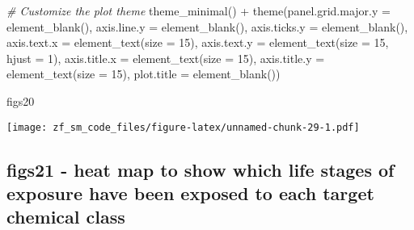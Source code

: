 \documentclass[
]{article}
\newenvironment{Shaded}{\begin{snugshade}}{\end{snugshade}}
\newcommand{\AttributeTok}[1]{\textcolor[rgb]{0.77,0.63,0.00}{#1}}
\newcommand{\CommentTok}[1]{\textcolor[rgb]{0.56,0.35,0.01}{\textit{#1}}}
\newcommand{\DecValTok}[1]{\textcolor[rgb]{0.00,0.00,0.81}{#1}}
\newcommand{\FunctionTok}[1]{\textcolor[rgb]{0.00,0.00,0.00}{#1}}
\newcommand{\NormalTok}[1]{#1}
\newcommand{\SpecialCharTok}[1]{\textcolor[rgb]{0.00,0.00,0.00}{#1}}
\begin{document}
\begin{Shaded}
\begin{Highlighting}[]
  \CommentTok{\# Customize the plot theme}
  \FunctionTok{theme\_minimal}\NormalTok{() }\SpecialCharTok{+}
  \FunctionTok{theme}\NormalTok{(}\AttributeTok{panel.grid.major.y =} \FunctionTok{element\_blank}\NormalTok{(),}
    \AttributeTok{axis.line.y =} \FunctionTok{element\_blank}\NormalTok{(),}
    \AttributeTok{axis.ticks.y =} \FunctionTok{element\_blank}\NormalTok{(),}
    \AttributeTok{axis.text.x =} \FunctionTok{element\_text}\NormalTok{(}\AttributeTok{size =} \DecValTok{15}\NormalTok{),}
    \AttributeTok{axis.text.y =} \FunctionTok{element\_text}\NormalTok{(}\AttributeTok{size =} \DecValTok{15}\NormalTok{, }\AttributeTok{hjust =} \DecValTok{1}\NormalTok{),}
    \AttributeTok{axis.title.x =} \FunctionTok{element\_text}\NormalTok{(}\AttributeTok{size =} \DecValTok{15}\NormalTok{),}
    \AttributeTok{axis.title.y =} \FunctionTok{element\_text}\NormalTok{(}\AttributeTok{size =} \DecValTok{15}\NormalTok{),}
    \AttributeTok{plot.title =} \FunctionTok{element\_blank}\NormalTok{())}

\NormalTok{figs20}
\end{Highlighting}
\end{Shaded}

\texttt{[image: zf\_sm\_code\_files/figure-latex/unnamed-chunk-29-1.pdf]}

\hypertarget{figs21---heat-map-to-show-which-life-stages-of-exposure-have-been-exposed-to-each-target-chemical-class}{%
\subsection{figs21 - heat map to show which life stages of exposure have
been exposed to each target chemical
class}\label{figs21---heat-map-to-show-which-life-stages-of-exposure-have-been-exposed-to-each-target-chemical-class}}
\end{document}
